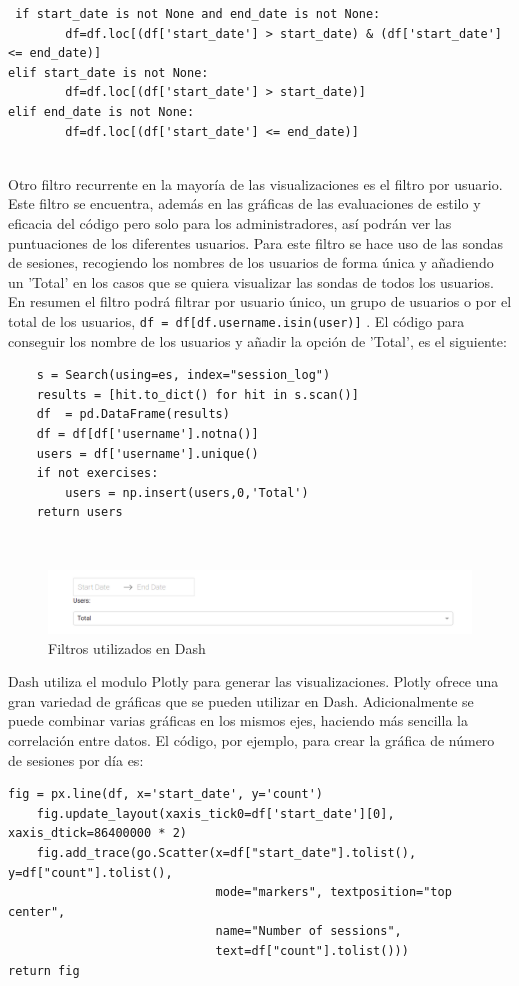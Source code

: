 {\footnotesize
\begin{verbatim}
 if start_date is not None and end_date is not None:
        df=df.loc[(df['start_date'] > start_date) & (df['start_date'] <= end_date)]
elif start_date is not None:
        df=df.loc[(df['start_date'] > start_date)]
elif end_date is not None:
        df=df.loc[(df['start_date'] <= end_date)]
\end{verbatim}
}
\\

Otro filtro recurrente en la mayoría de las visualizaciones es el filtro por usuario. Este filtro se encuentra, además en las gráficas de las evaluaciones de estilo y eficacia del código pero solo para los administradores, así podrán ver las puntuaciones de los diferentes usuarios. Para este filtro se hace uso de las sondas de sesiones, recogiendo los nombres de los usuarios de forma única y añadiendo un 'Total' en los casos que se quiera visualizar las sondas de todos los usuarios. En resumen el filtro podrá filtrar por usuario único, un grupo de usuarios o por el total de los usuarios, \texttt{df = df[df.username.isin(user)]} . El código para conseguir los nombre de los usuarios y añadir la opción de 'Total', es el siguiente:
\newpage
{\footnotesize
\begin{verbatim}
	s = Search(using=es, index="session_log")
    results = [hit.to_dict() for hit in s.scan()]
    df  = pd.DataFrame(results)
    df = df[df['username'].notna()]
    users = df['username'].unique()
    if not exercises:
        users = np.insert(users,0,'Total')
    return users
\end{verbatim}
}
\\
\begin{figure}[H]
    \centering
    \includegraphics[width=16cm, keepaspectratio]{img/filtros.png}
    \caption{Filtros utilizados en Dash}
    \label{fig:filtros}
\end{figure}

Dash utiliza el modulo Plotly para generar las visualizaciones. Plotly ofrece una gran variedad de gráficas que se pueden utilizar en Dash. Adicionalmente se puede combinar varias gráficas en los mismos ejes, haciendo más sencilla la correlación entre datos. El código, por ejemplo, para crear la gráfica de número de sesiones por día es:\\
{\footnotesize
\begin{verbatim}
fig = px.line(df, x='start_date', y='count')
    fig.update_layout(xaxis_tick0=df['start_date'][0], xaxis_dtick=86400000 * 2)
    fig.add_trace(go.Scatter(x=df["start_date"].tolist(), y=df["count"].tolist(),
                             mode="markers", textposition="top center", 
                             name="Number of sessions",
                             text=df["count"].tolist()))
return fig
\end{verbatim}
}
\\
\newpage

